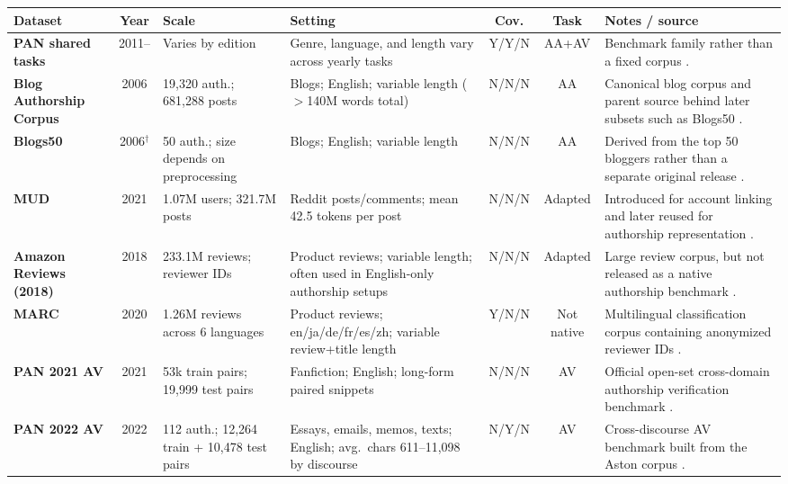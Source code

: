 \documentclass[11pt]{article}
\begin{document}
{\color{red}
\begin{table}[t]
\centering
\tiny
\setlength{\tabcolsep}{3pt}
\renewcommand{\arraystretch}{1.08}
\begin{tabular}{@{}L{2.45cm}cL{2.15cm}L{4.65cm}c c L{4.35cm}@{}}
\toprule
\textbf{Dataset} & \textbf{Year} & \textbf{Scale} & \textbf{Setting} & \textbf{Cov.} & \textbf{Task} & \textbf{Notes / source} \\
\midrule
\textbf{PAN shared tasks} & 2011-- & Varies by edition & Genre, language, and length vary across yearly tasks & Y/Y/N & AA+AV & Benchmark family rather than a fixed corpus \citep{pan_shared_tasks,potthast2016whowrote,bevendorff2020pan}. \\
\textbf{Blog Authorship Corpus} & 2006 & 19{,}320 auth.; 681{,}288 posts & Blogs; English; variable length ($>$140M words total) & N/N/N & AA & Canonical blog corpus and parent source behind later subsets such as Blogs50 \citep{schler2006effects}. \\
\textbf{Blogs50} & 2006$^\dagger$ & 50 auth.; size depends on preprocessing & Blogs; English; variable length & N/N/N & AA & Derived from the top 50 bloggers rather than a separate original release \citep{zhang-etal-2018-syntax}. \\
\textbf{MUD} & 2021 & 1.07M users; 321.7M posts & Reddit posts/comments; mean 42.5 tokens per post & N/N/N & Adapted & Introduced for account linking and later reused for authorship representation \citep{khan2021deepmetriclearningapproach,riverasoto2021luar}. \\
\textbf{Amazon Reviews (2018)} & 2018 & 233.1M reviews; reviewer IDs & Product reviews; variable length; often used in English-only authorship setups & N/N/N & Adapted & Large review corpus, but not released as a native authorship benchmark \citep{amazon_review_data_2018}. \\
\textbf{MARC} & 2020 & 1.26M reviews across 6 languages & Product reviews; en/ja/de/fr/es/zh; variable review+title length & Y/N/N & Not native & Multilingual classification corpus containing anonymized reviewer IDs \citep{keung2020marc}. \\
\textbf{PAN 2021 AV} & 2021 & 53k train pairs; 19{,}999 test pairs & Fanfiction; English; long-form paired snippets & N/N/N & AV & Official open-set cross-domain authorship verification benchmark \citep{pan2021av}. \\
\textbf{PAN 2022 AV} & 2022 & 112 auth.; 12{,}264 train + 10{,}478 test pairs & Essays, emails, memos, texts; English; avg.\ chars 611--11{,}098 by discourse & N/Y/N & AV & Cross-discourse AV benchmark built from the Aston corpus \citep{pan2022av}. \\

\end{tabular}
\end{table}}
\end{document}
